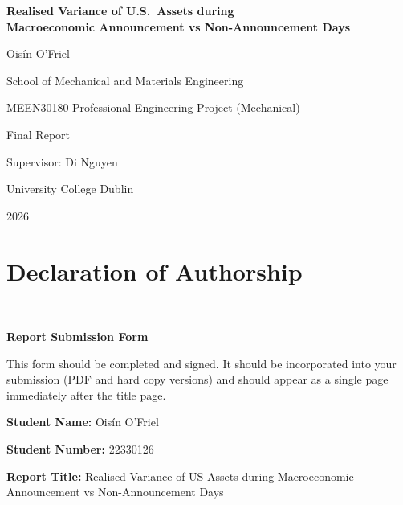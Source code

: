 \documentclass[12pt,a4paper]{report}
\begin{document}
\begin{titlepage}
\centering
\vspace*{2cm}
{\LARGE\bfseries Realised Variance of U.S.\ Assets during\\[6pt]
Macroeconomic Announcement vs Non-Announcement Days\par}
\vspace{2cm}
{\large Ois\'in O'Friel\par}
\vspace{0.4cm}
{\large School of Mechanical and Materials Engineering\par}
{\large MEEN30180 Professional Engineering Project (Mechanical)\par}
\vspace{0.4cm}
{\large Final Report\par}
\vspace{0.4cm}
{\large Supervisor: Di Nguyen\par}
\vspace{0.4cm}
{\large University College Dublin\par}
\vspace{0.4cm}
{\large 2026\par}
\end{titlepage}

\chapter*{Declaration of Authorship}
\\\begin{center}
    \textbf{Report Submission Form}
\end{center}


This form should be completed and signed. It should be incorporated into your submission (PDF and hard copy versions) and should appear as a single page immediately after the title page.

\textbf{Student Name: }Oisín O’Friel

\textbf{Student Number: }22330126 

\textbf{Report Title: }Realised Variance of US Assets during Macroeconomic Announcement vs Non-Announcement Days
\end{document}

